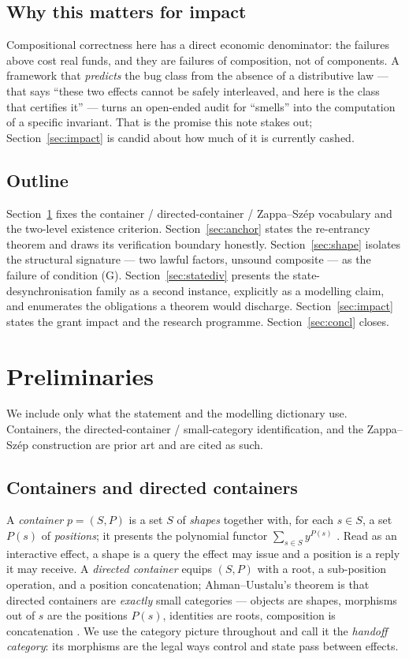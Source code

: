 \documentclass[11pt]{amsart}
\theoremstyle{definition}
\theoremstyle{remark}
\begin{document}
\subsection*{Why this matters for impact}
Compositional correctness here has a direct economic denominator: the failures above cost real
funds, and they are failures of composition, not of components. A framework that \emph{predicts}
the bug class from the absence of a distributive law --- that says ``these two effects cannot be
safely interleaved, and here is the class that certifies it'' --- turns an open-ended audit for
``smells'' into the computation of a specific invariant. That is the promise this note stakes out;
Section~\ref{sec:impact} is candid about how much of it is currently cashed.

\subsection*{Outline}
Section~\ref{sec:prelim} fixes the container / directed-container / Zappa--Sz\'ep vocabulary and
the two-level existence criterion. Section~\ref{sec:anchor} states the re-entrancy theorem and draws
its verification boundary honestly. Section~\ref{sec:shape} isolates the structural signature ---
two lawful factors, unsound composite --- as the failure of condition (G). Section~\ref{sec:statediv}
presents the state-desynchronisation family as a second instance, explicitly as a modelling claim,
and enumerates the obligations a theorem would discharge. Section~\ref{sec:impact} states the grant
impact and the research programme. Section~\ref{sec:concl} closes.

\section{Preliminaries}\label{sec:prelim}

We include only what the statement and the modelling dictionary use. Containers, the
directed-container / small-category identification, and the Zappa--Sz\'ep construction are prior
art and are cited as such.

\subsection*{Containers and directed containers}
A \emph{container} $p=(S,P)$ is a set $S$ of \emph{shapes} together with, for each $s\in S$, a set
$P(s)$ of \emph{positions}; it presents the polynomial functor $\sum_{s\in S} y^{P(s)}$
\cite{NiuSpivak,SpivakRef}. Read as an interactive effect, a shape is a query the effect may issue
and a position is a reply it may receive. A \emph{directed container} equips $(S,P)$ with a root, a
sub-position operation, and a position concatenation; Ahman--Uustalu's theorem is that directed
containers are \emph{exactly} small categories --- objects are shapes, morphisms out of $s$ are the
positions $P(s)$, identities are roots, composition is concatenation \cite{AhmanUustalu}. We use the
category picture throughout and call it the \emph{handoff category}: its morphisms are the legal
ways control and state pass between effects.
\end{document}
